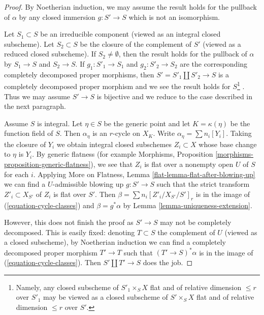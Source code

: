 \documentclass{stacks-project}
\theoremstyle{plain}
\theoremstyle{definition}
\theoremstyle{remark}
\numberwithin{equation}{subsection}
\begin{document}
\begin{proof}
By Noetherian induction, we may assume the result holds for the pullback of
$\alpha$ by any closed immersion $g : S' \to S$ which is not an isomorphism.

\medskip\noindent
Let $S_1 \subset S$ be an irreducible component (viewed as an integral closed
subscheme). Let $S_2 \subset S$ be the closure of the complement of $S'$
(viewed as a reduced closed subscheme). If $S_2 \not = \emptyset$, then
the result holds for the pullback of $\alpha$ by $S_1 \to S$ and $S_2 \to S$.
If $g_1 : S'_1 \to S_1$ and $g_2 : S'_2 \to S_2$
are the corresponding completely decomposed proper morphisms,
then $S' = S'_1 \amalg S'_2 \to S$
is a completely decomposed proper morphism and
we see the result holds for $S$\footnote{Namely, any closed
subscheme of $S'_1 \times_S X$ flat and of relative dimension
$\leq r$ over $S'_1$ may be viewed as a closed subscheme of $S' \times_S X$
flat and of relative dimension $\leq r$ over $S'$.}
. Thus we may assume $S' \to S$ is bijective
and we reduce to the case described in the next paragraph.

\medskip\noindent
Assume $S$ is integral. Let $\eta \in S$ be the generic point
and let $K = \kappa(\eta)$ be the function field of $S$.
Then $\alpha_\eta$ is an $r$-cycle on $X_K$.
Write $\alpha_\eta = \sum n_i[Y_i]$.
Taking the closure of $Y_i$ we obtain integral closed subschemes
$Z_i \subset X$ whose base change to $\eta$ is $Y_i$.
By generic flatness (for example Morphisms,
Proposition \ref{morphisms-proposition-generic-flatness}),
we see that $Z_i$ is flat over a nonempty open $U$ of $S$ for each $i$.
Applying More on Flatness, Lemma \ref{flat-lemma-flat-after-blowing-up}
we can find a $U$-admissible blowing up $g : S' \to S$
such that the strict transform $Z'_i \subset X_{S'}$
of $Z_i$ is flat over $S'$. Then $\beta = \sum n_i[Z'_i/X_{S'}/S']_r$
is in the image of (\ref{equation-cycle-classes}) and $\beta = g^*\alpha$
by Lemma \ref{lemma-uniqueness-extension}.

\medskip\noindent
However, this does not finish the proof as $S' \to S$ may not be
completely decomposed. This is easily fixed: denoting $T \subset S$
the complement of $U$ (viewed as a closed subscheme), by Noetherian
induction we can find a completely decomposed proper morphism
$T' \to T$ such that $(T' \to S)^*\alpha$
is in the image of (\ref{equation-cycle-classes}). Then
$S' \amalg T' \to S$ does the job.
\end{proof}
\end{document}
